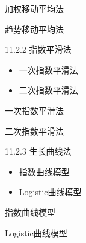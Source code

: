 \documentclass[
  ignorenonframetext,
]{beamer}
\providecommand{\tightlist}{%
  \setlength{\itemsep}{0pt}\setlength{\parskip}{0pt}}
\begin{document}
\begin{frame}{加权移动平均法}
\protect\hypertarget{ux52a0ux6743ux79fbux52a8ux5e73ux5747ux6cd5}{}

\end{frame}

\begin{frame}{趋势移动平均法}
\protect\hypertarget{ux8d8bux52bfux79fbux52a8ux5e73ux5747ux6cd5}{}

\end{frame}

\begin{frame}{11.2.2 指数平滑法}
\protect\hypertarget{ux6307ux6570ux5e73ux6ed1ux6cd5}{}

\begin{itemize}
\tightlist
\item
  一次指数平滑法
\item
  二次指数平滑法
\end{itemize}

\end{frame}

\begin{frame}{一次指数平滑法}
\protect\hypertarget{ux4e00ux6b21ux6307ux6570ux5e73ux6ed1ux6cd5}{}

\end{frame}

\begin{frame}{二次指数平滑法}
\protect\hypertarget{ux4e8cux6b21ux6307ux6570ux5e73ux6ed1ux6cd5}{}

\end{frame}

\begin{frame}{11.2.3 生长曲线法}
\protect\hypertarget{ux751fux957fux66f2ux7ebfux6cd5}{}

\begin{itemize}
\tightlist
\item
  指数曲线模型
\item
  Logistic曲线模型
\end{itemize}

\end{frame}

\begin{frame}{指数曲线模型}
\protect\hypertarget{ux6307ux6570ux66f2ux7ebfux6a21ux578b}{}

\end{frame}

\begin{frame}{Logistic曲线模型}
\protect\hypertarget{logisticux66f2ux7ebfux6a21ux578b}{}

\end{frame}
\end{document}
